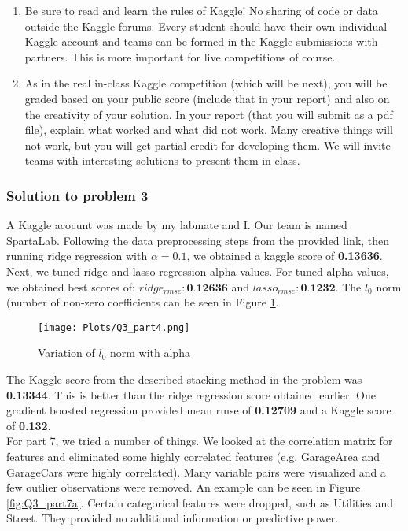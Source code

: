 \documentclass[12pt]{article}%
\begin{document}
\begin{enumerate}
    \item Be sure to read and learn the rules of Kaggle! No sharing of code or data outside the Kaggle forums. Every student should have their own individual Kaggle account and teams can be formed in the Kaggle submissions with partners. This is more important for live competitions of course.
    \item As in the real in-class Kaggle competition (which will be next), you will be graded based on your public score (include that in your report) and also on the creativity of your solution. In your report (that you will submit as a pdf file), explain what worked and what did not work. Many creative things will not work, but you will get partial credit for developing them. We will invite teams with interesting solutions to present them in class.\\
\end{enumerate}

\subsubsection{Solution to problem 3}

A Kaggle acocunt was made by my labmate and I. Our team is named SpartaLab. Following the data preprocessing steps from the provided link, then running ridge regression with $\alpha = 0.1$, we obtained a kaggle score of \textbf{0.13636}. Next, we tuned ridge and lasso regression alpha values. For tuned alpha values, we obtained best scores of: $ridge_{rmse}: \textbf{0.12636}$ and $lasso_{rmse}: \textbf{0.1232}$. The $l_0$ norm (number of non-zero coefficients can be seen in Figure \ref{fig:Q3_part4}.

\begin{figure}[h]
\texttt{[image: Plots/Q3\_part4.png]}
\centering
\caption{Variation of $l_0$ norm with alpha}
\label{fig:Q3_part4}
\centering
\end{figure}

The Kaggle score from the described stacking method in the problem was \textbf{0.13344}. This is better than the ridge regression score obtained earlier. One gradient boosted regression provided mean rmse of \textbf{0.12709} and a Kaggle score of \textbf{0.132}.\\

For part 7, we tried a number of things. We looked at the correlation matrix for features and eliminated some highly correlated features (e.g. GarageArea and GarageCars were highly correlated). Many variable pairs were visualized and a few outlier observations were removed. An example can be seen in Figure \ref{fig:Q3_part7a}. Certain categorical features were dropped, such as Utilities and Street. They provided no additional information or predictive power.\\
\end{document}
